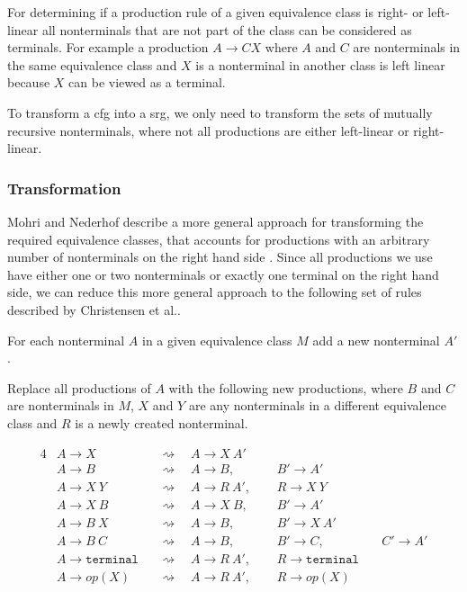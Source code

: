 For determining if a production rule of a given equivalence class is right- or left-linear all nonterminals that are not part of the class can be considered as terminals. For example a production $A \rightarrow CX$ where $A$ and $C$ are nonterminals in the same equivalence class and $X$ is a nonterminal in another class is left linear because $X$ can be viewed as a terminal.

To transform a \ac{cfg} into a \ac{srg}, we only need to transform the sets of mutually recursive nonterminals, where not all productions are either left-linear or right-linear.

\subsubsection{Transformation}

Mohri and Nederhof describe a more general approach for transforming the required equivalence classes, that accounts for productions with an arbitrary number of nonterminals on the right hand side \cite{mohri_nederhof}. Since all productions we use have either one or two nonterminals or exactly one terminal on the right hand side, we can reduce this more general approach to the following set of rules described by Christensen et al.\cite{brics}.

For each nonterminal $A$ in a given equivalence class $M$ add a new nonterminal $A'$.

Replace all productions of $A$ with the following new productions, where $B$ and $C$ are nonterminals in $M$, $X$ and $Y$ are any nonterminals in a different equivalence class and $R$ is a newly created nonterminal.

\noindent
\begin{alignat*}{4}
	& A \rightarrow X 	 && \rightsquigarrow \quad A \rightarrow X\ A'\ \  & &\\
	& A \rightarrow B 	 && \rightsquigarrow \quad A \rightarrow B,\ \ 	   & &B' \rightarrow A'\ &&\\
	& A \rightarrow X\ Y && \rightsquigarrow \quad A \rightarrow R\ A',\ \ & &R  \rightarrow X\ Y\ &&\\
	& A \rightarrow X\ B && \rightsquigarrow \quad A \rightarrow X\ B,\ \  & &B' \rightarrow A'\ &&\\
	& A \rightarrow B\ X && \rightsquigarrow \quad A \rightarrow B,\ \ 	   & &B' \rightarrow X\ A'\ &&\\
	& A \rightarrow B\ C && \rightsquigarrow \quad A \rightarrow B,\ \     & &B' \rightarrow C,\ &&C' \rightarrow A'\\
	& A \rightarrow \texttt{terminal} && \rightsquigarrow \quad A \rightarrow R\ A',\ \ & &R \rightarrow \texttt{terminal}\ &&\\
	& A \rightarrow op(X) && \rightsquigarrow  \quad A \rightarrow R\ A',\ \ & &R \rightarrow op(X)\ &&\\
\end{alignat*}

